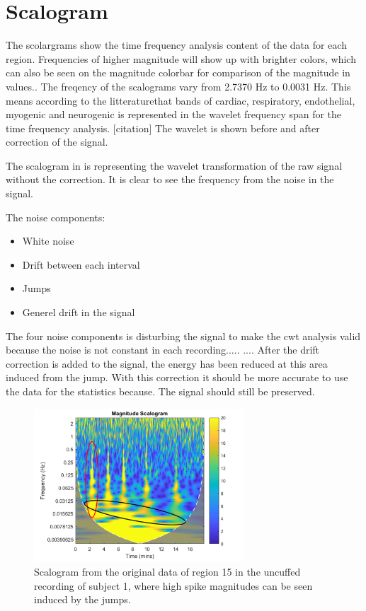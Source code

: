 \section{Scalogram}

The scolargrams show the time frequency analysis content of the data for each region. Frequencies of higher magnitude will show up with brighter colors, which can also be seen on the magnitude colorbar for comparison of the magnitude in values.. 
The freqency of the scalograms vary from 2.7370 Hz to 0.0031 Hz. This means according to the litteraturethat bands of cardiac, respiratory, endothelial, myogenic and neurogenic is represented in the wavelet frequency span for the time frequency analysis. [citation]
The wavelet is shown before and after correction of the signal. 

The scalogram in  is representing the wavelet transformation of the raw signal without the correction. It is clear to see the frequency from the noise in the signal. 

The noise components:
\begin{itemize}
	\item White noise
	\item Drift between each interval
	\item Jumps
	\item Generel drift in the signal
\end{itemize}

The four noise components is disturbing the signal to make the cwt analysis valid because the noise is not constant in each recording.....
....
After the drift correction is added to the signal, the energy  has been reduced at this area induced from the jump. With this correction it should be more accurate to use the data for the statistics because. The signal should still be  preserved. 

\begin{figure}[H]
	\includegraphics[width=0.7\textwidth]{figures/uncuffed_sub3_roi8_uncorr}
	\caption{Scalogram from the original data of region 15 in the uncuffed recording of subject 1, where high spike magnitudes can be seen induced by the jumps.}
	\label{fig:scalogram_uncorr}
\end{figure}




